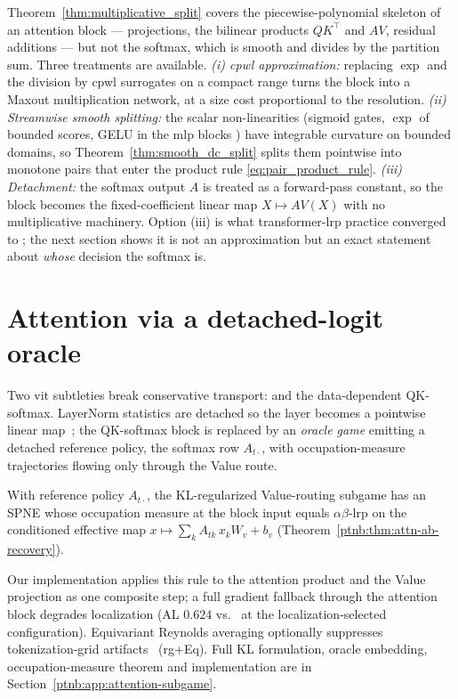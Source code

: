 \begin{remark}\label{rem:smooth_gates}
Theorem~\ref{thm:multiplicative_split} covers the piecewise-polynomial skeleton of an attention block --- projections, the bilinear products $QK^\top$ and $AV$, residual additions --- but not the softmax, which is smooth and divides by the partition sum. Three treatments are available. \emph{(i) \ac{cpwl} approximation:} replacing $\exp$ and the division by \ac{cpwl} surrogates on a compact range turns the block into a Maxout multiplication network, at a size cost proportional to the resolution. \emph{(ii) Streamwise smooth splitting:} the scalar non-linearities (sigmoid gates, $\exp$ of bounded scores, GELU in the \ac{mlp} blocks \parencite{Hendrycks2016}) have integrable curvature on bounded domains, so Theorem~\ref{thm:smooth_dc_split} splits them pointwise into monotone pairs that enter the product rule \eqref{eq:pair_product_rule}. \emph{(iii) Detachment:} the softmax output $A$ is treated as a forward-pass constant, so the block becomes the fixed-coefficient linear map $X \mapsto AV(X)$ with no multiplicative machinery. Option (iii) is what transformer-\ac{lrp} practice converged to \parencite{Ali2022AttnLRP,Achtibat2024AttnLRP,Wrobel2024}; the next section shows it is not an approximation but an exact statement about \emph{whose} decision the softmax is.
\end{remark}

\section{Attention via a detached-logit oracle}\label{ptnb:sec:attention}

Two \ac{vit} subtleties break conservative transport: 
and the data-dependent QK-softmax. LayerNorm statistics are detached so the layer becomes a pointwise linear
map~\parencite{Ali2022AttnLRP,Wrobel2024}; the QK-softmax block is replaced by an \emph{oracle game} emitting
a detached reference policy, the softmax row $A_{t\cdot}$, with occupation-measure trajectories
flowing only through the Value route. 

\begin{theoremenv}\label{ptnb:thm:attention}
With reference policy $A_{t\cdot}$, the KL-regularized Value-routing subgame has an SPNE whose
occupation measure at the block input equals $\alpha\beta$-\ac{lrp} on the conditioned effective
map $x \mapsto \sum_k A_{tk}\, x_k W_v + b_v$ (Theorem~\ref{ptnb:thm:attn-ab-recovery}).
\end{theoremenv}
Our implementation applies this rule to the attention product and the Value projection as one
composite step; a full gradient fallback through the attention block degrades localization (AL
$0.624$ vs.\ \vitRGlocAL{} at the localization-selected configuration). Equivariant Reynolds
averaging optionally suppresses tokenization-grid artifacts~\parencite{Wrobel2024} (\ac{rg}+Eq). Full
KL formulation, oracle embedding, occupation-measure theorem and implementation are in
Section~\ref{ptnb:app:attention-subgame}.
